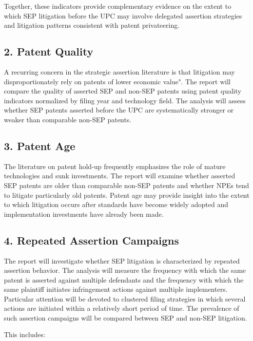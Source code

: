 \documentclass[12pt]{article}
\begin{document}
Together, these indicators provide complementary evidence on the extent to which SEP litigation before the UPC may involve delegated assertion strategies and litigation patterns consistent with patent privateering.



\subsection*{2. Patent Quality}

A recurring concern in the strategic assertion literature is that litigation may disproportionately rely on patents of lower economic value".
The report will compare the quality of asserted SEP and non-SEP patents using patent quality indicators normalized by filing year and technology field.
The analysis will assess whether SEP patents asserted before the UPC are systematically stronger or weaker than comparable non-SEP patents.

\subsection*{3. Patent Age}

The literature on patent hold-up frequently emphasizes the role of mature technologies and sunk investments. The report will examine whether asserted SEP patents are older than comparable non-SEP patents and whether NPEs tend to litigate particularly old patents. Patent age may provide insight into the extent to which litigation occurs after standards have become widely adopted and implementation investments have already been made.

\subsection*{4. Repeated Assertion Campaigns}

The report will investigate whether SEP litigation is characterized by repeated assertion behavior. The analysis will measure the frequency with which the same patent is asserted against multiple defendants and the frequency with which the same plaintiff initiates infringement actions against multiple implementers. Particular attention will be devoted to clustered filing strategies in which several actions are initiated within a relatively short period of time. The prevalence of such assertion campaigns will be compared between SEP and non-SEP litigation.


This includes:
\end{document}
